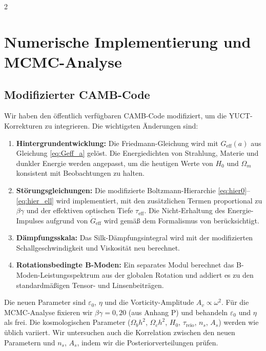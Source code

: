 \documentclass[11pt,a4paper]{article}
\begin{document}
	\begin{multicols}{2}
		
		\section{Numerische Implementierung und MCMC-Analyse}
		
		\subsection{Modifizierter CAMB-Code}
		
		Wir haben den öffentlich verfügbaren CAMB-Code \cite{Lewis2000} modifiziert, um die YUCT-Korrekturen zu integrieren. Die wichtigsten Änderungen sind:
		\begin{enumerate}
			\item \textbf{Hintergrundentwicklung:} Die Friedmann-Gleichung wird mit $G_{\mathrm{eff}}(a)$ aus Gleichung \eqref{eq:Geff_a} gelöst. Die Energiedichten von Strahlung, Materie und dunkler Energie werden angepasst, um die heutigen Werte von $H_0$ und $\Omega_m$ konsistent mit Beobachtungen zu halten.
			\item \textbf{Störungsgleichungen:} Die modifizierte Boltzmann-Hierarchie \eqref{eq:hier0}--\eqref{eq:hier_ell} wird implementiert, mit den zusätzlichen Termen proportional zu $\beta\gamma$ und der effektiven optischen Tiefe $\tau_{\mathrm{eff}}$. Die Nicht-Erhaltung des Energie-Impulses aufgrund von $\dot{G}_{\mathrm{eff}}$ wird gemäß dem Formalismus von \cite{Uzan2011} berücksichtigt.
			\item \textbf{Dämpfungsskala:} Das Silk-Dämpfungsintegral wird mit der modifizierten Schallgeschwindigkeit und Viskosität neu berechnet.
			\item \textbf{Rotationsbedingte B-Moden:} Ein separates Modul berechnet das B-Moden-Leistungsspektrum aus der globalen Rotation und addiert es zu den standardmäßigen Tensor- und Linsenbeiträgen.
		\end{enumerate}
		Die neuen Parameter sind $\varepsilon_0$, $\eta$ und die Vorticity-Amplitude $A_v \propto \omega^2$. Für die MCMC-Analyse fixieren wir $\beta\gamma = 0,20$ (aus Anhang P) und behandeln $\varepsilon_0$ und $\eta$ als frei. Die kosmologischen Parameter ($\Omega_b h^2$, $\Omega_c h^2$, $H_0$, $\tau_{\mathrm{reio}}$, $n_s$, $A_s$) werden wie üblich variiert. Wir untersuchen auch die Korrelation zwischen den neuen Parametern und $n_s$, $A_s$, indem wir die Posteriorverteilungen prüfen.
		

\end{multicols}
\end{document}
